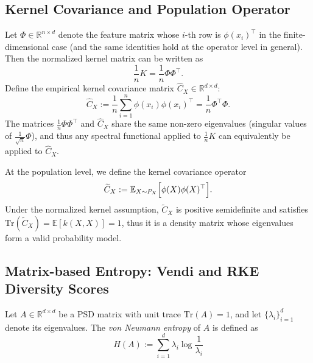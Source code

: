 \documentclass{article}
\theoremstyle{plain}
\theoremstyle{definition}
\begin{document}
\subsection{Kernel Covariance and Population Operator}
Let $\Phi\in\mathbb{R}^{n\times d}$ denote the feature matrix whose $i$-th row is $\phi(x_i)^\top$ in the finite-dimensional case (and the same identities hold at the operator level in general).
Then the normalized kernel matrix can be written as
\begin{equation}
    \frac{1}{n}K = \frac{1}{n}\Phi\Phi^\top.
\end{equation}
Define the empirical kernel covariance matrix $\widehat{C}_X\in\mathbb{R}^{d\times d}$:
\begin{equation}
    \widehat{C}_X := \frac{1}{n}\sum_{i=1}^n \phi(x_i)\phi(x_i)^\top = \frac{1}{n}\Phi^\top\Phi.
\end{equation}
The matrices $\frac{1}{n}\Phi\Phi^\top$ and $\widehat{C}_X$ share the same non-zero eigenvalues (singular values of $\frac{1}{\sqrt{n}}\Phi$), and thus any spectral functional applied to $\frac{1}{n}K$ can equivalently be applied to $\widehat{C}_X$.

At the population level, we define the kernel covariance operator
\begin{equation}
    \widetilde{C}_X := \mathbb{E}_{X\sim P_X}\Bigl[\phi(X)\phi(X)^\top\Bigr].
\end{equation}
Under the normalized kernel assumption, $\widetilde{C}_X$ is positive semidefinite and satisfies $\mathrm{Tr}(\widetilde{C}_X)=\mathbb{E}[k(X,X)]=1$, thus it is a density matrix whose eigenvalues form a valid probability model.

\subsection{Matrix-based Entropy: Vendi and RKE Diversity Scores}
Let $A\in\mathbb{R}^{d\times d}$ be a PSD matrix with unit trace $\mathrm{Tr}(A)=1$, and let $\{\lambda_i\}_{i=1}^d$ denote its eigenvalues.
The \textit{von Neumann entropy} of $A$ is defined as
\begin{equation}\label{eq:von_neumann_entropy}
    H(A) := \sum_{i=1}^d \lambda_i \log\frac{1}{\lambda_i}
\end{equation}
\end{document}
